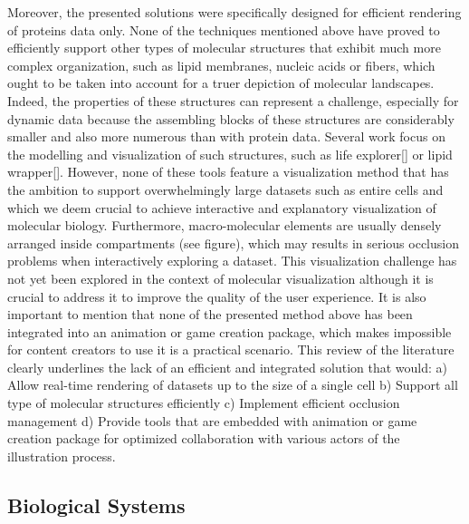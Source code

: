 Moreover, the presented solutions were specifically designed for efficient rendering of proteins data only.
None of the techniques mentioned above have proved to efficiently support other types of molecular structures that exhibit much more complex organization, such as lipid membranes, nucleic acids or fibers, which ought to be taken into account for a truer depiction of molecular landscapes.
Indeed, the properties of these structures can represent a challenge, especially for dynamic data because the assembling blocks of these structures are considerably smaller and also more numerous than with protein data.
Several work focus on the modelling and visualization of such structures, such as life explorer[] or lipid wrapper[].
However, none of these tools feature a visualization method that has the ambition to support overwhelmingly large datasets such as entire cells and which we deem crucial to achieve interactive and explanatory visualization of molecular biology.
Furthermore, macro-molecular elements are usually densely arranged inside compartments (see figure), which may results in serious occlusion problems when interactively exploring a dataset.
This visualization challenge has not yet been explored in the context of molecular visualization although it is crucial to address it to improve the quality of the user experience.
It is also important to mention that none of the presented method above has been integrated into an animation or game creation package, which makes impossible for content creators to use it is a practical scenario.
This review of the literature clearly underlines the lack of an efficient and integrated solution that would:
a) Allow real-time rendering of datasets up to the size of a single cell
b) Support all type of molecular structures efficiently
c) Implement efficient occlusion management
d) Provide tools that are embedded with animation or game creation package for optimized collaboration with various actors of the illustration process.

\subsection{Biological Systems}

